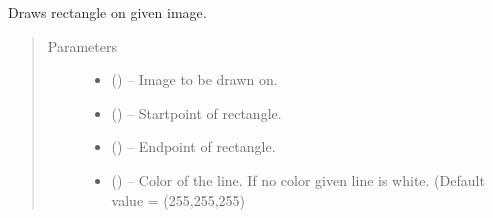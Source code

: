 \documentclass[letterpaper,10pt,english]{sphinxmanual}
\begin{document}
\begin{fulllineitems}
\label{\detokenize{image_helpers:image_helpers.draw_rectangle}}
Draws rectangle on given image.
\begin{quote}\begin{description}
\item[{Parameters}] \leavevmode\begin{itemize}
\item {} 
 () -- Image to be drawn on.

\item {} 
 () -- Startpoint of rectangle.

\item {} 
 () -- Endpoint of rectangle.

\item {} 
 () -- Color of the line. If no color given line is white.
(Default value = (255,255,255)

\end{itemize}

\end{description}\end{quote}

\end{fulllineitems}

\end{document}

